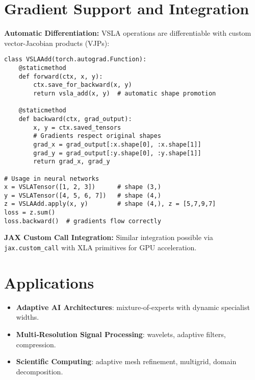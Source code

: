 \documentclass[11pt]{article}
\begin{document}
\section{Gradient Support and Integration}  
\label{sec:autograd}

\textbf{Automatic Differentiation:} VSLA operations are differentiable with custom vector-Jacobian products (VJPs):

\begin{tcolorbox}[colback=api,colframe=green!50!black,title=PyTorch Integration Example]
\begin{verbatim}
class VSLAAdd(torch.autograd.Function):
    @staticmethod
    def forward(ctx, x, y):
        ctx.save_for_backward(x, y)
        return vsla_add(x, y)  # automatic shape promotion
    
    @staticmethod  
    def backward(ctx, grad_output):
        x, y = ctx.saved_tensors
        # Gradients respect original shapes
        grad_x = grad_output[:x.shape[0], :x.shape[1]]  
        grad_y = grad_output[:y.shape[0], :y.shape[1]]
        return grad_x, grad_y

# Usage in neural networks
x = VSLATensor([1, 2, 3])      # shape (3,)
y = VSLATensor([4, 5, 6, 7])   # shape (4,) 
z = VSLAAdd.apply(x, y)        # shape (4,), z = [5,7,9,7]
loss = z.sum()
loss.backward()  # gradients flow correctly
\end{verbatim}
\end{tcolorbox}

\textbf{JAX Custom Call Integration:} Similar integration possible via \texttt{jax.custom\_call} with XLA primitives for GPU acceleration.

\section{Applications}
\begin{samepage}
\begin{itemize}[leftmargin=1.5em]
  \item \textbf{Adaptive AI Architectures}: mixture‑of‑experts with dynamic specialist widths.
  \item \textbf{Multi‑Resolution Signal Processing}: wavelets, adaptive filters, compression.
  \item \textbf{Scientific Computing}: adaptive mesh refinement, multigrid, domain decomposition.
\end{itemize}
\end{samepage}
\end{document}
